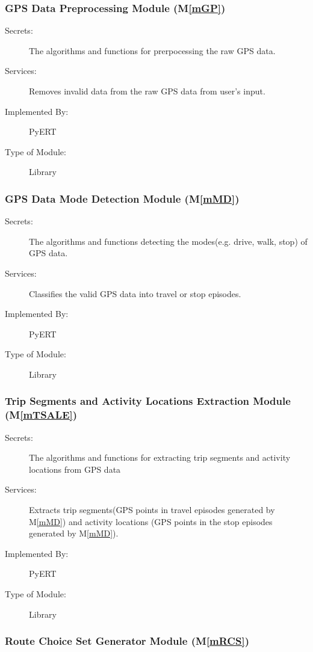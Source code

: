 \documentclass[12pt, titlepage]{article}
\newcommand{\mref}[1]{M\ref{#1}}
\begin{document}
\subsubsection{GPS Data Preprocessing Module (\mref{mGP})}

\begin{description}
\item[Secrets:]The algorithms and functions for prerpocessing the raw GPS data.
\item[Services:]Removes invalid data from the raw GPS data from user's input.
\item[Implemented By:] PyERT
\item[Type of Module:] Library
\end{description}

\subsubsection{GPS Data Mode Detection Module (\mref{mMD})}
\begin{description}
\item[Secrets:]The algorithms and functions detecting the modes(e.g. drive, walk, stop) of GPS data.
\item[Services:]Classifies the valid GPS data into travel or stop episodes.
\item[Implemented By:] PyERT
\item[Type of Module:] Library
\end{description}

\subsubsection{Trip Segments and Activity Locations Extraction Module (\mref{mTSALE})}

\begin{description}
\item[Secrets:]The algorithms and functions for extracting trip segments and activity locations from GPS data
\item[Services:]Extracts trip segments(GPS points in travel episodes generated by \mref{mMD}) and activity locations (GPS points in the stop episodes generated by \mref{mMD}).
\item[Implemented By:] PyERT
\item[Type of Module:] Library
\end{description}

\subsubsection{Route Choice Set Generator Module (\mref{mRCS})}
\end{document}

